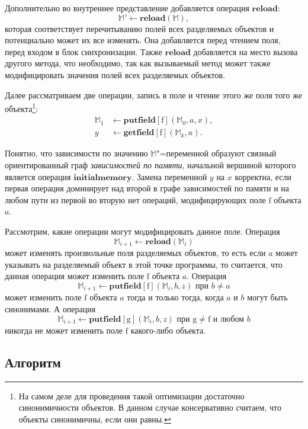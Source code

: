 \documentclass[14pt,titlepage,draft]{extarticle}
\newcommand{\M}{\ensuremath{\mathbb{M}}}
\newcommand{\field}[1]{\mathrm{#1}}
\newcommand{\op}[1]{\mathbf{#1}}
\begin{document}
    Дополнительно во внутреннее представление добавляется операция
    $\op{reload}$:
    \[ \M' \gets \op{reload}(\M), \]
    которая соответствует перечитыванию полей всех разделяемых объектов и
    потенциально может их все изменять.
    Она добавляется перед чтением  поля, перед входом в блок
    синхронизации. Также $\op{reload}$ добавляется на место вызова другого
    метода, что необходимо, так как вызываемый метод может также модифицировать
    значения полей всех разделяемых объектов.

    Далее рассматриваем две операции, запись в поле и чтение этого же поля того
    же объекта\footnote{
      На самом деле для проведения такой оптимизации достаточно синонимичности
      объектов. В данном случае консервативно считаем, что объекты
      синонимичны, если они равны.
    }:
    \begin{align*}
      \M_1 &\gets \op{putfield}[\field{f}](\M_0, a, x), \\
      y &\gets \op{getfield}[\field{f}](\M_k, a).
    \end{align*}

    Понятно, что зависимости по значению \M"=переменной образуют связный
    ориентированный граф \emph{зависимостей по памяти}, начальной вершиной
    которого является операция $\op{initialmemory}$.
    Замена переменной $y$ на $x$ корректна, если первая операция доминирует над
    второй в графе зависимостей по памяти и на любом пути из первой во
    вторую нет операций, модифицирующих поле $\field{f}$ объекта $a$.

    Рассмотрим, какие операции могут модифицировать данное поле.
    Операция \[\M_{i+1} \gets \op{reload}(\M_i)\] может изменять произвольные
    поля разделяемых объектов, то есть если $a$ может указывать на разделяемый
    объект в этой точке программы, то считается, что данная операция может
    изменить поле $\field{f}$ объекта $a$.
    Операция
    \[\M_{i+1} \gets \op{putfield}[\field{f}](\M_i, b, z)
      \text{ при } b \neq a\]
    может изменить поле $\field{f}$ объекта $a$ тогда и только тогда, когда
    $a$ и $b$ могут быть синонимами.
    А операция
    \[\M_{i+1} \gets \op{putfield}[\field{g}](\M_i, b, z)
      \text{ при } \field{g} \neq \field{f} \text{ и любом } b\]
    никогда не может изменить поле $\field{f}$ какого-либо объекта.

  \subsection{Алгоритм}
\end{document}
